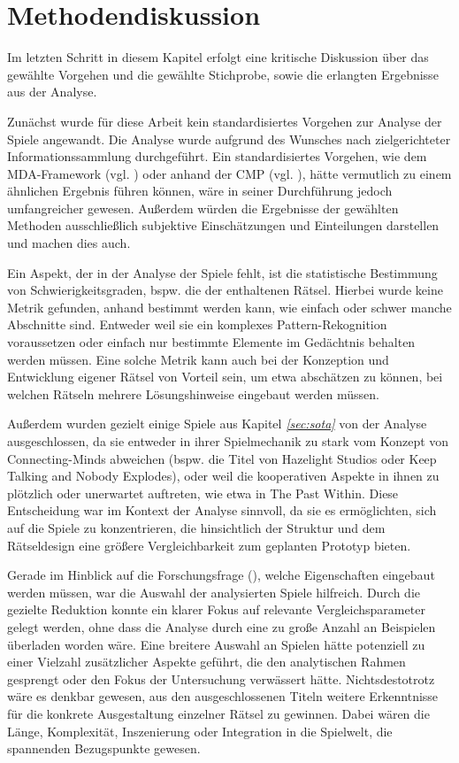 \section{Methodendiskussion}\label{sec:analysis-discussion}
Im letzten Schritt in diesem Kapitel erfolgt eine kritische Diskussion über das gewählte Vorgehen und die gewählte Stichprobe, sowie die erlangten Ergebnisse aus der Analyse.

Zunächst wurde für diese Arbeit kein standardisiertes Vorgehen zur Analyse der Spiele angewandt. Die Analyse wurde aufgrund des Wunsches nach zielgerichteter Informationssammlung durchgeführt. Ein standardisiertes Vorgehen, wie dem \ac{MDA}-Framework (vgl. \citealp{hunicke_mda_2004}) oder anhand der \ac{CMP} (vgl. \citealp{seif_el-nasr_understanding_2010}), hätte vermutlich zu einem ähnlichen Ergebnis führen können, wäre in seiner Durchführung jedoch umfangreicher gewesen.
Außerdem würden die Ergebnisse der gewählten Methoden ausschließlich subjektive Einschätzungen und Einteilungen darstellen und machen dies auch.

Ein Aspekt, der in der Analyse der Spiele fehlt, ist die statistische Bestimmung von Schwierigkeitsgraden, bspw. die der enthaltenen Rätsel. Hierbei wurde keine Metrik gefunden, anhand bestimmt werden kann, wie einfach oder schwer manche Abschnitte sind. Entweder weil sie ein komplexes Pattern-Rekognition voraussetzen oder einfach nur bestimmte Elemente im Gedächtnis behalten werden müssen. Eine solche Metrik kann auch bei der Konzeption und Entwicklung eigener Rätsel von Vorteil sein, um etwa abschätzen zu können, bei welchen Rätseln mehrere Lösungshinweise eingebaut werden müssen.

Außerdem wurden gezielt einige Spiele aus Kapitel \textit{\ref{sec:sota}} von der Analyse ausgeschlossen, da sie entweder in ihrer Spielmechanik zu stark vom Konzept von Connecting-Minds abweichen (bspw. die Titel von Hazelight Studios oder Keep Talking and Nobody Explodes), oder weil die kooperativen Aspekte in ihnen zu plötzlich oder unerwartet auftreten, wie etwa in The Past Within. Diese Entscheidung war im Kontext der Analyse sinnvoll, da sie es ermöglichten, sich auf die Spiele zu konzentrieren, die hinsichtlich der Struktur und dem Rätseldesign eine größere Vergleichbarkeit zum geplanten Prototyp bieten.

Gerade im Hinblick auf die Forschungsfrage (), welche Eigenschaften eingebaut werden müssen, war die Auswahl der analysierten Spiele hilfreich. Durch die gezielte Reduktion konnte ein klarer Fokus auf relevante Vergleichsparameter gelegt werden, ohne dass die Analyse durch eine zu große Anzahl an Beispielen überladen worden wäre. Eine breitere Auswahl an Spielen hätte potenziell zu einer Vielzahl zusätzlicher Aspekte geführt, die den analytischen Rahmen gesprengt oder den Fokus der Untersuchung verwässert hätte.
Nichtsdestotrotz wäre es denkbar gewesen, aus den ausgeschlossenen Titeln weitere Erkenntnisse für die konkrete Ausgestaltung einzelner Rätsel zu gewinnen. Dabei wären die Länge, Komplexität, Inszenierung oder Integration in die Spielwelt, die spannenden Bezugspunkte gewesen. 

